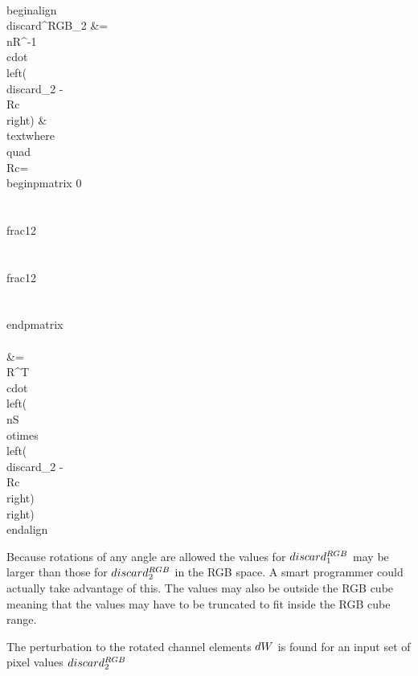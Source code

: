 \\begin{align}
\\discard^{RGB}_2 &= \\nR^{-1} \\cdot \\left( \\discard_2 - \\Rc
        \\right) & \\text{where} \\quad \\Rc=\\begin{pmatrix}
                 0   \\\\
                 \\frac{1}{2}    \\\\
                 \\frac{1}{2}     \\\\
                \\end{pmatrix} \\\\
&= \\R^{T} \\cdot \\left( \\nS \\otimes \\left( \\discard_2 - \\Rc
                \\right) \\right)  
\\end{align}

Because rotations of any angle are allowed the values for $\\discard^{RGB}_1$ may be larger than those for $\\discard^{RGB}_2$ in the RGB space. A smart programmer could actually take advantage of this. The values may also be outside the RGB cube meaning that the values may have to be truncated to fit inside the RGB cube range. 

The perturbation to the rotated channel elements $\\dW$ is found for an input set of pixel values $\\discard^{RGB}_2$

